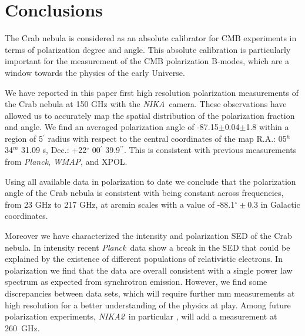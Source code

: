 \documentclass[twocolumn,traditabstract]{aa}
\def\NIKA{\textit{NIKA}}
\def\NIKAd{\textit{NIKA2}}
\def\Planck{\textit{Planck}}
\def\WMAP{\textit{WMAP}}
\begin{document}


\section{Conclusions}\label{sec:conclusions}
The Crab nebula is considered as an absolute calibrator for CMB experiments in
terms of polarization degree and angle. This absolute calibration is
particularly important for the measurement of the CMB polarization B-modes,
which are a window towards the physics of the early Universe.

We have reported in this paper first high resolution polarization measurements
of the Crab nebula at 150 GHz with the \NIKA\ camera. These observations have
allowed us to accurately map the spatial distribution of the polarization
fraction and angle.  We find an averaged polarization angle of
-87.15$\pm$0.04$\pm$1.8 within a region of 5$^\prime$ radius with respect to the
central coordinates of the map R.A.: 05$^{h}$ 34$^{m}$ 31.09 s, Dec.:
+22$^{\circ}$ 00$^{\prime}$ 39.9$^{\prime\prime}$.  This is consistent with
previous measurements from \Planck, \WMAP, and XPOL.

Using all available data in polarization to date we conclude that the
polarization angle of the Crab nebula is consistent with being constant across
frequencies, from 23 GHz to 217 GHz, at arcmin scales with a value of
-88.1$^{\circ}\pm$0.3 in Galactic coordinates.

Moreover we have characterized the intensity and polarization SED of the Crab
nebula. In intensity recent \Planck\ data show a break in the SED that
  could be explained by the existence of different populations of
relativistic electrons. In polarization we find that the data are overall
consistent with a single power law spectrum as expected from synchrotron
emission. However, we find some discrepancies between data sets, which will
require further mm measurements at high resolution for a better understanding of
the physics at play. Among future polarization experiments,
  \NIKAd\ in particular \citep{calvo2016}, will add a
  measurement at 260~GHz.
\end{document}
